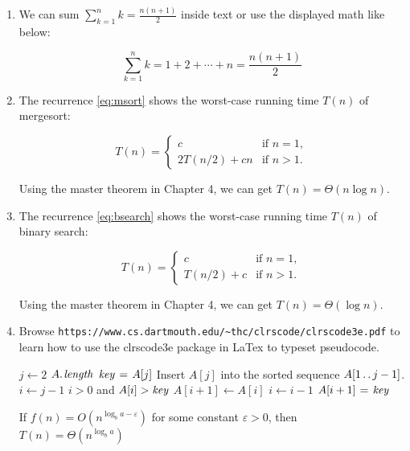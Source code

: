 \documentclass[11pt]{article}
\begin{document}
\begin{enumerate}

\itemsep 0.35in

\item We can sum $\sum_{k=1}^{n} k = \frac{ n ( n + 1)}{2} $ inside text or
      use the displayed math like below:
      
      \[
        \sum_{k=1}^{n} k = 1 + 2 + \cdots + n = \frac{ n ( n + 1)}{2}
      \]

\item The recurrence \eqref{eq:msort} shows the worst-case running time $T(n)$ 
      of mergesort:


      \begin{equation} 
         T(n)=\begin{cases}
               c             & \text{if $n = 1$},\\
               2T(n/2) + cn  & \text{if $n > 1$}.  \label{eq:msort}
              \end{cases}
      \end{equation}

      Using the master theorem in Chapter 4, we can 
      get $T(n) = \Theta (n \log{} n)$.

\item The recurrence \eqref{eq:bsearch} shows the worst-case running time $T(n)$
      of binary search:

      \begin{equation} 
         T(n)=\begin{cases}
               c             & \text{if $n = 1$},\\
               T(n/2) + c    & \text{if $n > 1$}.  \label{eq:bsearch}
              \end{cases}
      \end{equation}

      Using the master theorem in Chapter 4, we can 
      get $T(n) = \Theta (\log{} n)$.


\item Browse {\tt https://www.cs.dartmouth.edu/\textasciitilde thc/clrscode/clrscode3e.pdf} 
      to learn how to use the clrscode3e package in LaTex  to typeset 
      pseudocode.  

\begin{codebox}
\li \For $j \gets 2$ \To $\attrib{A}{length}$
\li \Do
        $\id{key} \gets A[j]$
\li \Comment Insert $A[j]$ into the sorted sequence
        $A[1 \mathinner{\ldotp\ldotp} j-1]$.
\li     $i \gets j-1$
\li     \While $i > 0$ and $A[i] > \id{key}$
\li     \Do
            $A[i+1] \gets A[i]$
\li         $i \gets i-1$
        \End
\li     $A[i+1] \gets \id{key}$
    \End
\end{codebox}

      If $ f(n)= O(n^{\log_b a-\varepsilon}) $ for some constant $\varepsilon>0 $, then $ T(n)= \Theta(n^{\log_b a}) $

   
\end{enumerate}
\end{document}
